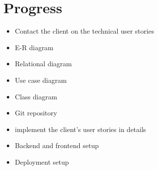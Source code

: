 \documentclass{article}
\begin{document}
\pagebreak

\section{Progress}

    \begin{itemize}
        
        \item Contact the client on the technical user stories 
        \item E-R diagram
        \item Relational diagram
        \item Use case diagram 
        \item Class diagram
        \item Git repository
        \item implement the client's user stories in details 
        \item Backend and frontend setup
        \item Deployment setup 

     \end{itemize}
        
\end{document}
